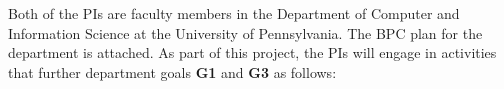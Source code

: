 Both of the PIs are faculty members in the Department of Computer and Information
Science at the University of Pennsylvania. The BPC plan for the department is
attached. As part of this project, the PIs will engage in activities that
further department goals \textbf{G1} and \textbf{G3} as follows:






